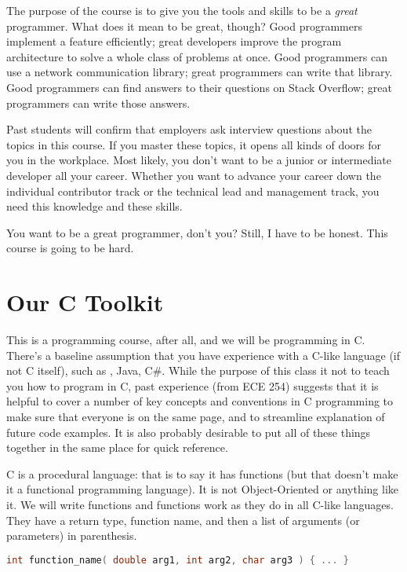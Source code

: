 The purpose of the course is to give you the tools and skills to be a \textit{great} programmer. What does it mean to be great, though? Good programmers implement a feature efficiently; great developers improve the program architecture to solve a whole class of problems at once. Good programmers can use a network communication library; great programmers can write that library. Good programmers can find answers to their questions on Stack Overflow; great programmers can write those answers.

Past students will confirm that employers ask interview questions about the topics in this course. If you master these topics, it opens all kinds of doors for you in the workplace. Most likely, you don't want to be a junior or intermediate developer all your career. Whether you want to advance your career down the individual contributor track or the technical lead and management track, you need this knowledge and these skills.

You want to be a great programmer, don't you? Still, I have to be honest. This course is going to be hard. 

\section*{Our C Toolkit}

This is a programming course, after all, and we will be programming in C. There's a baseline assumption that you have experience with a C-like language (if not C itself), such as \Cpp, Java, C\#. While the purpose of this class it not to teach you how to program in C, past experience (from ECE 254) suggests that it is helpful to cover a number of key concepts and conventions in C programming to make sure that everyone is on the same page, and to streamline explanation of future code examples. It is also probably desirable to put all of these things together in the same place for quick reference.

C is a procedural language: that is to say it has functions (but that doesn't make it a functional programming language). It is not Object-Oriented or anything like it. We will write functions and functions work as they do in all C-like languages. They have a return type, function name, and then a list of arguments (or parameters) in parenthesis.

\begin{lstlisting}[language=C]
int function_name( double arg1, int arg2, char arg3 ) { ... }
\end{lstlisting}

